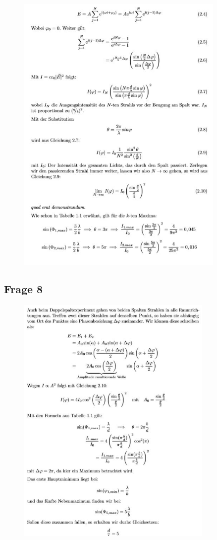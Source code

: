 \documentclass[a4paper,10pt]{scrartcl}
\begin{document}
\FloatBarrier
			\begin{figure}[h]
\centering
\includegraphics[width=0.9\textwidth]{./Bilder/lb04}

\end{figure}
\FloatBarrier

		\subsection{Frage 8}
		\FloatBarrier
			\begin{figure}[h]
\centering
\includegraphics[width=0.85\textwidth]{./Bilder/lb05}

\end{figure}
\FloatBarrier

		
	
\end{document}
